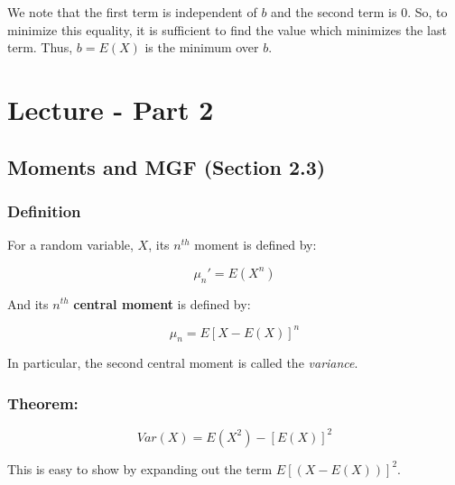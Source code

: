 \documentclass{article}
\begin{document}
\noindent We note that the first term is independent of $b$ and the second term is $0$. So, to minimize this equality, it is sufficient to find the value which minimizes the last term. Thus, $b = E(X)$ is the minimum over $b$.

\section{Lecture - Part 2}

\subsection{Moments and MGF (Section 2.3)}

\subsubsection*{Definition}
For a random variable, $X$, its $n^{th}$ moment is defined by:

\begin{equation*}
    \mu_n' = E(X^n)
\end{equation*}

And its $n^{th}$ \textbf{central moment} is defined by:

\begin{equation*}
    \mu_n = E[X-E(X)]^n
\end{equation*}

In particular, the second central moment is called the \textit{variance}.

\subsubsection*{Theorem:}
\begin{equation*}
    Var(X) = E(X^2) - [E(X)]^2
\end{equation*}

This is easy to show by expanding out the term $E[(X-E(X))]^2$.
\end{document}
